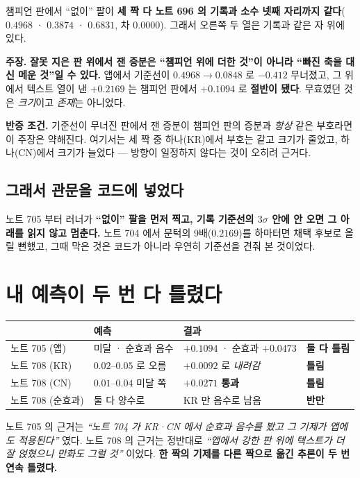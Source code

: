 \documentclass[10pt,a4paper]{article}
\newcommand{\claim}[2]{\begin{claimbox}\textbf{주장.} #1\par\smallskip
  \textcolor{gray!70}{\textbf{반증 조건.} #2}\end{claimbox}}
\begin{document}
챔피언 판에서 ``없이'' 팔이 \textbf{세 짝 다 노트 696 의 기록과 소수 넷째 자리까지
같다}($0.4968$ · $0.3874$ · $0.6831$, 차 $0.0000$). 그래서 오른쪽 두 열은 기록과 같은
자 위에 있다.

\claim{\textbf{잘못 지은 판 위에서 잰 증분은 ``챔피언 위에 더한 것''이 아니라
``빠진 축을 대신 메운 것''일 수 있다.} 앱에서 기준선이 $0.4968 \to 0.0848$ 로
$-0.412$ 무너졌고, 그 위에서 텍스트 열이 낸 $+0.2169$ 는 챔피언 판에서 $+0.1094$ 로
\textbf{절반이 됐다}. 무효였던 것은 \emph{크기}이고 \emph{존재}는 아니었다.}
{기준선이 무너진 판에서 잰 증분이 챔피언 판의 증분과 \emph{항상} 같은 부호라면 이
주장은 약해진다. 여기서는 세 짝 중 하나(KR)에서 부호는 같고 크기가 줄었고, 하나(CN)에서
크기가 늘었다 --- 방향이 일정하지 않다는 것이 오히려 근거다.}

\subsection*{그래서 관문을 코드에 넣었다}

노트 705 부터 러너가 \textbf{``없이'' 팔을 먼저 찍고, 기록 기준선의 $3\sigma$ 안에
안 오면 그 아래를 읽지 않고 멈춘다.} 노트 704 에서 문턱의 9배($0.2169$)를 하마터면
채택 후보로 올릴 뻔했고, 그때 막은 것은 코드가 아니라 우연히 기준선을 견줘 본 것이었다.

\section{내 예측이 두 번 다 틀렸다}

\begin{center}
\begin{tabular}{llll}
\toprule
 & 예측 & 결과 & \\
\midrule
노트 705 (앱) & 미달 · 순효과 음수 & $+0.1094$ · 순효과 $+0.0473$ & \textbf{둘 다 틀림} \\
노트 708 (KR) & $0.02$--$0.05$ 로 오름 & $+0.0092$ 로 \emph{내려감} & \textbf{틀림} \\
노트 708 (CN) & $0.01$--$0.04$ 미달 쪽 & $+0.0271$ \textbf{통과} & \textbf{틀림} \\
노트 708 (순효과) & 둘 다 양수로 & KR 만 음수로 남음 & \textbf{반만} \\
\bottomrule
\end{tabular}
\end{center}

노트 705 의 근거는 \emph{``노트 704 가 KR·CN 에서 순효과 음수를 봤고 그 기제가 앱에도
적용된다''} 였다. 노트 708 의 근거는 정반대로 \emph{``앱에서 강한 판 위에 텍스트가 더 잘
얹혔으니 만화도 그럴 것''} 이었다. \textbf{한 짝의 기제를 다른 짝으로 옮긴 추론이 두 번
연속 틀렸다.}
\end{document}

